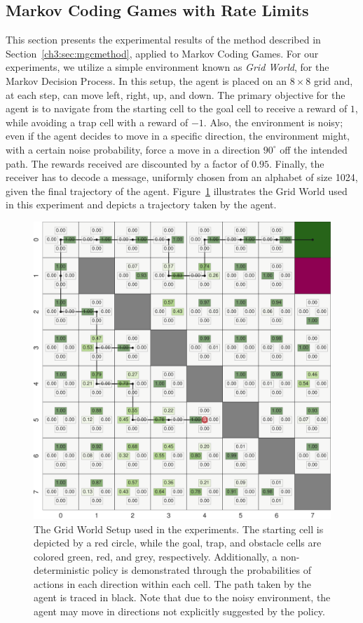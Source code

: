 \subsection{Markov Coding Games with Rate Limits}

This section presents the experimental results of the method described in Section~\ref{ch3:sec:mgcmethod}, applied to Markov Coding Games. For our experiments, we utilize a simple environment known as \textit{Grid World}, for the Markov Decision Process. In this setup, the agent is placed on an \(8 \times 8\) grid and, at each step, can move left, right, up, and down. The primary objective for the agent is to navigate from the starting cell to the goal cell to receive a reward of \(1\), while avoiding a trap cell with a reward of \(-1\).
Also, the environment is noisy; even if the agent decides to move in a specific direction, the environment might, with a certain noise probability, force a move in a direction \(90^\circ\) off the intended path. The rewards received are discounted by a factor of \(0.95\). Finally, the receiver has to decode a message, uniformly chosen from an alphabet of size 1024, given the final trajectory of the agent. Figure~\ref{ch3:fig:gwbeta0} illustrates the Grid World used in this experiment and depicts a trajectory taken by the agent.

\begin{figure}[h!]
    \centering
    \includegraphics[width=0.75\linewidth]{figs/ch3/gw_beta0.pdf}
    \caption{The Grid World Setup used in the experiments. The starting cell is depicted by a red circle, while the goal, trap, and obstacle cells are colored green, red, and grey, respectively. Additionally, a non-deterministic policy is demonstrated through the probabilities of actions in each direction within each cell. The path taken by the agent is traced in black. Note that due to the noisy environment, the agent may move in directions not explicitly suggested by the policy.
    }\label{ch3:fig:gwbeta0}
\end{figure}

